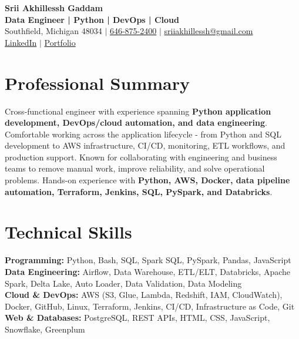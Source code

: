 \documentclass[letterpaper,10pt]{article}
\begin{document}
\fontsize{9.35pt}{10.45pt}\selectfont

\begin{center}
    {\LARGE \textbf{Srii Akhillessh Gaddam}} \\[-1pt]
    \textbf{Data Engineer | Python | DevOps | Cloud} \\[2pt]
    Southfield, Michigan 48034 $|$
    \href{tel:6468752400}{646-875-2400} $|$
    \href{mailto:sriiakhillessh@gmail.com}{sriiakhillessh@gmail.com} \\[1pt]
    \href{https://www.linkedin.com/in/srii-akhiilessh-gaddam-b48668191/}{LinkedIn} $|$
    \href{https://sriiakhillesshg.github.io/portfolio/}{Portfolio}
\end{center}
\vspace{-8pt}

\section{Professional Summary}
\small{Cross-functional engineer with experience spanning \textbf{Python application development, DevOps/cloud automation, and data engineering}. Comfortable working across the application lifecycle - from Python and SQL development to AWS infrastructure, CI/CD, monitoring, ETL workflows, and production support. Known for collaborating with engineering and business teams to remove manual work, improve reliability, and solve operational problems. Hands-on experience with \textbf{Python, AWS, Docker, data pipeline automation, Terraform, Jenkins, SQL, PySpark, and Databricks}.}

\section{Technical Skills}
\small{
\textbf{Programming:} Python, Bash, SQL, Spark SQL, PySpark, Pandas, JavaScript \\
\textbf{Data Engineering:} Airflow, Data Warehouse, ETL/ELT, Databricks, Apache Spark, Delta Lake, Auto Loader, Data Validation, Data Modeling \\
\textbf{Cloud \& DevOps:} AWS (S3, Glue, Lambda, Redshift, IAM, CloudWatch), Docker, GitHub, Linux, Terraform, Jenkins, CI/CD, Infrastructure as Code, Git \\
\textbf{Web \& Databases:} PostgreSQL, REST APIs, HTML, CSS, JavaScript, Snowflake, Greenplum
}
\end{document}
